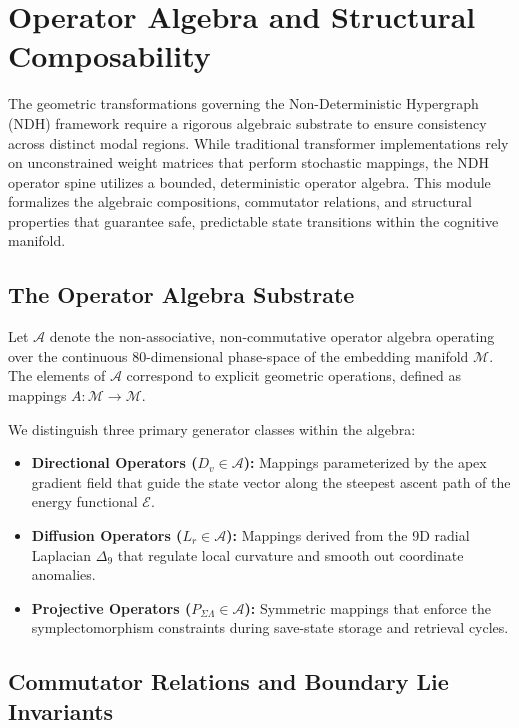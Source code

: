 \section{Operator Algebra and Structural Composability}
\label{sec:operator-algebra}

The geometric transformations governing the Non-Deterministic Hypergraph (NDH) framework require a rigorous algebraic substrate to ensure consistency across distinct modal regions. While traditional transformer implementations rely on unconstrained weight matrices that perform stochastic mappings, the NDH operator spine utilizes a bounded, deterministic operator algebra. This module formalizes the algebraic compositions, commutator relations, and structural properties that guarantee safe, predictable state transitions within the cognitive manifold.

\subsection{The Operator Algebra Substrate}

Let $\mathcal{A}$ denote the non-associative, non-commutative operator algebra operating over the continuous 80-dimensional phase-space of the embedding manifold $\mathcal{M}$. The elements of $\mathcal{A}$ correspond to explicit geometric operations, defined as mappings $A : \mathcal{M} \to \mathcal{M}$. 

We distinguish three primary generator classes within the algebra:
\begin{itemize}
    \item \textbf{Directional Operators ($D_v \in \mathcal{A}$):} Mappings parameterized by the apex gradient field that guide the state vector along the steepest ascent path of the energy functional $\mathcal{E}$.
    \item \textbf{Diffusion Operators ($L_r \in \mathcal{A}$):} Mappings derived from the 9D radial Laplacian $\Delta_9$ that regulate local curvature and smooth out coordinate anomalies.
    \item \textbf{Projective Operators ($P_{\Sigma\Lambda} \in \mathcal{A}$):} Symmetric mappings that enforce the symplectomorphism constraints during save-state storage and retrieval cycles.
\end{itemize}

\subsection{Commutator Relations and Boundary Lie Invariants}

